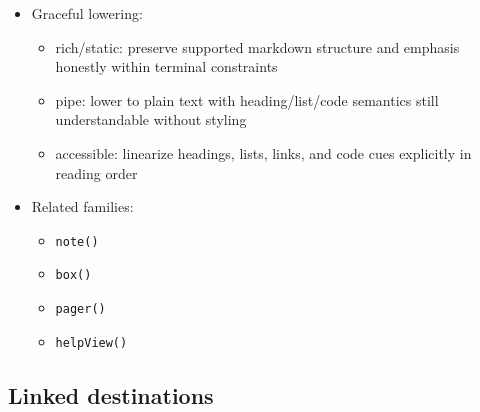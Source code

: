 \begin{itemize}
  \begin{itemize}
  \tightlist
  \item
    core
  \end{itemize}
\item
  Graceful lowering:

  \begin{itemize}
  \tightlist
  \item
    rich/static: preserve supported markdown structure and emphasis honestly within terminal constraints
  \item
    pipe: lower to plain text with heading/list/code semantics still understandable without styling
  \item
    accessible: linearize headings, lists, links, and code cues explicitly in reading order
  \end{itemize}
\item
  Related families:

  \begin{itemize}
  \tightlist
  \item
    \texttt{n\allowbreak{}o\allowbreak{}t\allowbreak{}e\allowbreak{}(\allowbreak{})}
  \item
    \texttt{b\allowbreak{}o\allowbreak{}x\allowbreak{}(\allowbreak{})}
  \item
    \texttt{p\allowbreak{}a\allowbreak{}g\allowbreak{}e\allowbreak{}r\allowbreak{}(\allowbreak{})}
  \item
    \texttt{h\allowbreak{}e\allowbreak{}l\allowbreak{}p\allowbreak{}V\allowbreak{}i\allowbreak{}e\allowbreak{}w\allowbreak{}(\allowbreak{})}
  \end{itemize}
\end{itemize}

\subsection{Linked destinations}\label{record-019-linked-destinations}

